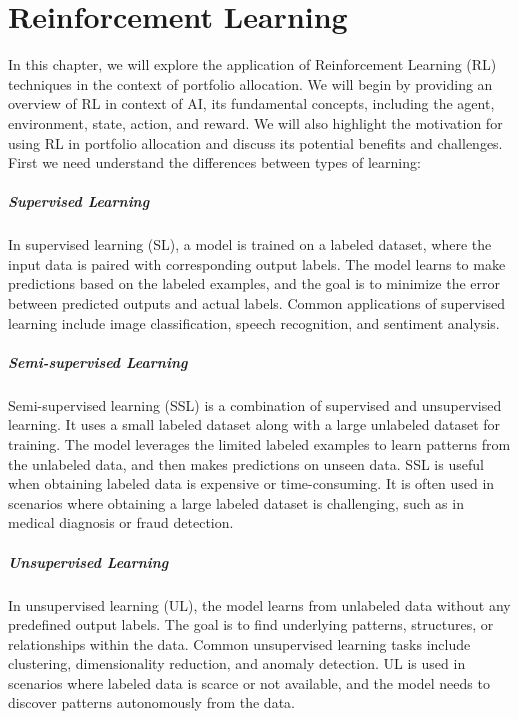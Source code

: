\documentclass[../chapters.tex]{subfiles}
\begin{document}
    \chapter{Reinforcement Learning}\label{ch:reinforcement-learning}

    In this chapter, we will explore the application of Reinforcement Learning (RL) techniques in the context of portfolio allocation.
    We will begin by providing an overview of RL in context of AI, its fundamental concepts, including the agent, environment, state, action, and reward.
    We will also highlight the motivation for using RL in portfolio allocation and discuss its potential benefits and challenges.
    First we need understand the differences between types of learning:

    \paragraph{Supervised Learning}
    In supervised learning (SL), a model is trained on a labeled dataset, where the input data is paired with corresponding output labels.
    The model learns to make predictions based on the labeled examples, and the goal is to minimize the error between predicted outputs and actual labels.
    Common applications of supervised learning include image classification, speech recognition, and sentiment analysis.

    \paragraph{Semi-supervised Learning}
    Semi-supervised learning (SSL) is a combination of supervised and unsupervised learning.
    It uses a small labeled dataset along with a large unlabeled dataset for training.
    The model leverages the limited labeled examples to learn patterns from the unlabeled data, and then makes predictions on unseen data.
    SSL is useful when obtaining labeled data is expensive or time-consuming.
    It is often used in scenarios where obtaining a large labeled dataset is challenging, such as in medical diagnosis or fraud detection.

    \paragraph{Unsupervised Learning}
    In unsupervised learning (UL), the model learns from unlabeled data without any predefined output labels.
    The goal is to find underlying patterns, structures, or relationships within the data.
    Common unsupervised learning tasks include clustering, dimensionality reduction, and anomaly detection.
    UL is used in scenarios where labeled data is scarce or not available, and the model needs to discover patterns autonomously from the data.
\end{document}
